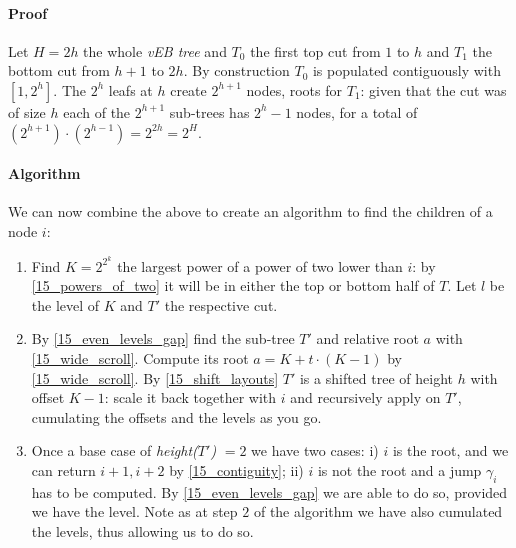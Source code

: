 \paragraph{Proof} Let $H = 2h$ the whole \emph{vEB tree} and $T_0$ the first top cut from $1$ to $h$ and $T_1$ the bottom cut from $h + 1$ to $2h$.
By construction $T_0$ is populated contiguously with $[1, 2^h]$.
The $2^h$ leafs at $h$ create $2^{h + 1}$ nodes, roots for $T_1$: given that the cut was of size $h$ each of the $2^{h + 1}$ sub-trees has $2^h - 1$ nodes, for a total of $(2^{h + 1}) \cdot (2^{h - 1}) = 2^{2h} = 2^H$.

\paragraph{Algorithm} We can now combine the above to create an algorithm to find the children of a node $i$:
	\begin{enumerate}
	\item Find $K = 2^{2^k}$ the largest power of a power of two lower than $i$: by \ref{15_powers_of_two} it will be in either the top or bottom half of $T$.
	Let $l$ be the level of $K$ and $T'$ the respective cut.
	\item By \ref{15_even_levels_gap} find the sub-tree $T'$ and relative root $a$ with \ref{15_wide_scroll}.
	Compute its root $a = K + t \cdot (K - 1)$ by \ref{15_wide_scroll}.
	By \ref{15_shift_layouts} $T'$ is a shifted tree of height $h$ with offset $K - 1$: scale it back together with $i$ and recursively apply on $T'$, cumulating the offsets and the levels as you go.
	\item Once a base case of \emph{height($T'$)} $= 2$ we have two cases: i) $i$ is the root, and we can return $i + 1, i + 2$ by \ref{15_contiguity}; ii) $i$ is not the root and a jump $\gamma_i$ has to be computed.
	By \ref{15_even_levels_gap} we are able to do so, provided we have the level.
	Note as at step $2$ of the algorithm we have also cumulated the levels, thus allowing us to do so.
	\end{enumerate}

